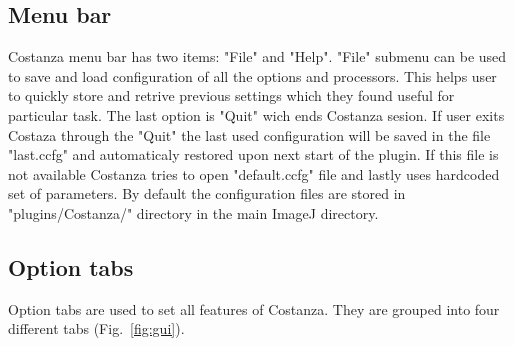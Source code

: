 \documentclass[a4paper,12pt]{article}
\begin{document}
\subsection{Menu bar}

Costanza menu bar has two items: "File" and "Help". "File" submenu can be used to save and load configuration of all the options and processors. This helps user to quickly store and retrive previous settings which they found useful for particular task. The last option is "Quit" wich ends Costanza sesion. If user exits Costaza through the "Quit" the last used configuration will be saved in the file "last.ccfg" and automaticaly restored upon next start of the plugin. If this file is not available Costanza tries to open "default.ccfg" file and lastly uses hardcoded set of parameters. By default the configuration files are stored in "plugins/Costanza/" directory in the main ImageJ directory.
 
\subsection{Option tabs}

Option tabs are used to set all features of Costanza. They are grouped into four different tabs (Fig.~\ref{fig:gui}). 
\end{document}
